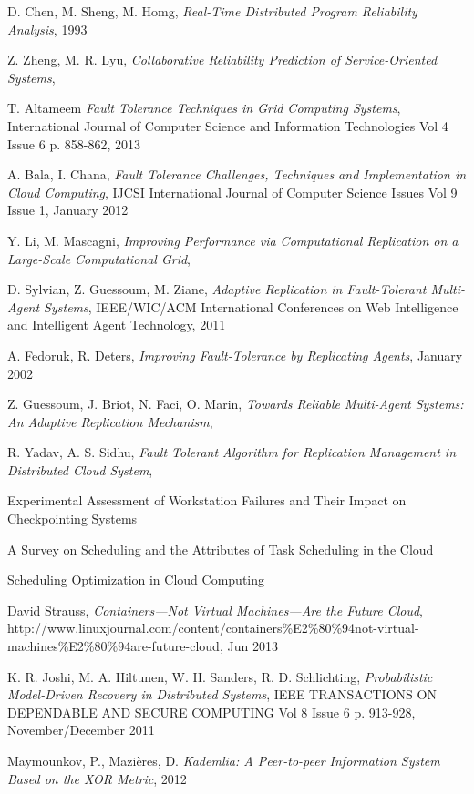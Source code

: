 \documentclass{cslthse-msc}
\begin{document}
\begin{thebibliography}{50}
	D. Chen, M. Sheng, M. Homg,
	\emph{Real-Time Distributed Program Reliability Analysis},
	1993

	Z. Zheng, M. R. Lyu,
	\emph{Collaborative Reliability Prediction of Service-Oriented Systems},

	T. Altameem
	\emph{Fault Tolerance Techniques in Grid Computing Systems},
	International Journal of Computer Science and Information Technologies Vol 4 Issue 6 p. 858-862,
	2013

	A. Bala, I. Chana,
	\emph{Fault Tolerance Challenges, Techniques and Implementation in Cloud Computing},
	IJCSI International Journal of Computer Science Issues Vol 9 Issue 1,
	January 2012

	Y. Li, M. Mascagni,
	\emph{Improving Performance via Computational Replication on a Large-Scale Computational Grid},

	D. Sylvian, Z. Guessoum, M. Ziane,
	\emph{Adaptive Replication in Fault-Tolerant Multi-Agent Systems},
	IEEE/WIC/ACM International Conferences on Web Intelligence and Intelligent Agent Technology,
	2011

	A. Fedoruk, R. Deters,
	\emph{Improving Fault-Tolerance by Replicating Agents},
	January 2002

	Z. Guessoum, J. Briot, N. Faci, O. Marin,
	\emph{Towards Reliable Multi-Agent Systems: An Adaptive Replication Mechanism},

	R. Yadav, A. S. Sidhu,
	\emph{Fault Tolerant Algorithm for Replication Management in Distributed Cloud System},
	

Experimental Assessment of Workstation Failures and Their Impact on Checkpointing Systems

A Survey on Scheduling and the Attributes of Task Scheduling in the Cloud

Scheduling Optimization in Cloud Computing

	David Strauss,
	\emph{Containers—Not Virtual Machines—Are the Future Cloud},
	http://www.linuxjournal.com/content/containers\%E2\%80\%94not-virtual-machines\%E2\%80\%94are-future-cloud,
	Jun 2013
	
	K. R. Joshi, M. A. Hiltunen, W. H. Sanders, R. D. Schlichting,
	\emph{Probabilistic Model-Driven Recovery in Distributed Systems},
	IEEE TRANSACTIONS ON DEPENDABLE AND SECURE COMPUTING Vol 8 Issue 6 p. 913-928,
	November/December 2011
	
	Maymounkov, P., Mazières, D.
	\emph{Kademlia: A Peer-to-peer Information System Based on the XOR Metric}, 2012
	


\end{thebibliography}
\end{document}
